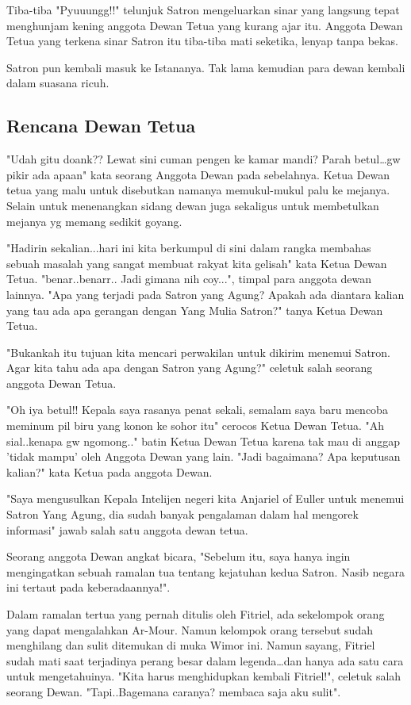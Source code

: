 \documentclass[a4paper,11pt,final]{article}
\begin{document}
Tiba-tiba "Pyuuungg!!" telunjuk Satron mengeluarkan sinar yang 
langsung tepat menghunjam kening anggota Dewan Tetua yang kurang 
ajar itu.
Anggota Dewan Tetua yang terkena sinar Satron itu tiba-tiba mati 
seketika, lenyap tanpa bekas.

Satron pun kembali masuk ke Istananya. Tak lama kemudian para dewan 
kembali dalam suasana ricuh.

\subsection{Rencana Dewan Tetua}
"Udah gitu doank?? Lewat sini cuman pengen ke kamar mandi? Parah 
betul\ldots gw pikir ada apaan" kata seorang Anggota Dewan pada 
sebelahnya.
Ketua Dewan tetua yang malu untuk disebutkan namanya memukul-mukul 
palu ke mejanya. Selain untuk menenangkan sidang dewan juga 
sekaligus untuk membetulkan mejanya yg memang sedikit goyang.

"Hadirin sekalian...hari ini kita berkumpul di sini dalam rangka 
membahas sebuah masalah yang sangat membuat rakyat kita gelisah" 
kata Ketua Dewan Tetua.
"benar..benarr.. Jadi gimana nih coy...", timpal para anggota dewan 
lainnya.
"Apa yang terjadi pada Satron yang Agung? Apakah ada diantara kalian 
yang tau ada apa gerangan dengan Yang Mulia Satron?" tanya Ketua 
Dewan Tetua.

"Bukankah itu tujuan kita mencari perwakilan untuk dikirim menemui 
Satron. Agar kita tahu ada apa dengan Satron yang Agung?" 
celetuk salah seorang anggota Dewan Tetua. 

"Oh iya betul!! Kepala saya rasanya penat sekali, semalam saya baru 
mencoba meminum pil biru yang konon ke sohor itu" cerocos 
Ketua Dewan Tetua.
"Ah sial..kenapa gw ngomong.." batin Ketua Dewan Tetua karena tak mau 
di anggap 'tidak mampu' oleh Anggota Dewan yang lain. 
"Jadi bagaimana? Apa keputusan kalian?" kata Ketua pada anggota Dewan.

"Saya mengusulkan Kepala Intelijen negeri kita Anjariel of Euller 
untuk menemui Satron Yang Agung, dia sudah banyak pengalaman dalam hal 
mengorek informasi" jawab salah satu anggota dewan tetua.

Seorang anggota Dewan angkat bicara, "Sebelum itu, saya hanya ingin 
mengingatkan sebuah ramalan tua tentang kejatuhan kedua Satron. 
Nasib negara ini tertaut pada keberadaannya!".

Dalam ramalan tertua yang pernah ditulis oleh Fitriel, ada sekelompok 
orang yang dapat mengalahkan Ar-Mour. 
Namun kelompok orang tersebut sudah menghilang dan sulit ditemukan di 
muka Wimor ini.
Namun sayang, Fitriel sudah mati saat terjadinya perang besar dalam 
legenda\ldots dan hanya ada satu cara untuk mengetahuinya. 
"Kita harus menghidupkan kembali Fitriel!", celetuk salah seorang Dewan. 
"Tapi..Bagemana caranya? membaca saja aku sulit".
\end{document}
